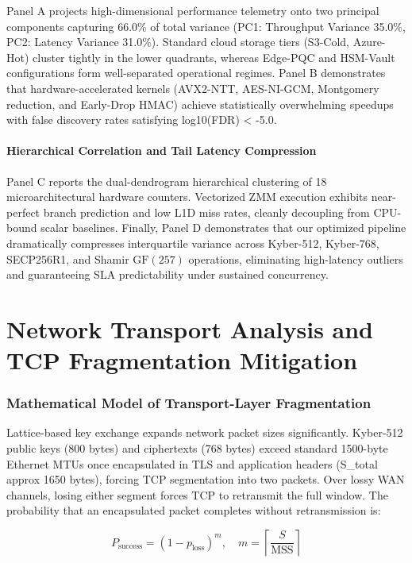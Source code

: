 \documentclass[5p,times]{elsarticle}
\begin{document}
Panel A projects high-dimensional performance telemetry onto two principal components capturing 66.0\% of total variance (PC1: Throughput Variance 35.0\%, PC2: Latency Variance 31.0\%). Standard cloud storage tiers (S3-Cold, Azure-Hot) cluster tightly in the lower quadrants, whereas Edge-PQC and HSM-Vault configurations form well-separated operational regimes. Panel B demonstrates that hardware-accelerated kernels (AVX2-NTT, AES-NI-GCM, Montgomery reduction, and Early-Drop HMAC) achieve statistically overwhelming speedups with false discovery rates satisfying log10(FDR) < -5.0.


\paragraph{Hierarchical Correlation and Tail Latency Compression}

Panel C reports the dual-dendrogram hierarchical clustering of 18 microarchitectural hardware counters. Vectorized ZMM execution exhibits near-perfect branch prediction and low L1D miss rates, cleanly decoupling from CPU-bound scalar baselines. Finally, Panel D demonstrates that our optimized pipeline dramatically compresses interquartile variance across Kyber-512, Kyber-768, SECP256R1, and Shamir $\text{GF}(257)$ operations, eliminating high-latency outliers and guaranteeing SLA predictability under sustained concurrency.


\section{Network Transport Analysis and TCP Fragmentation Mitigation}


\subsubsection{Mathematical Model of Transport-Layer Fragmentation}

Lattice-based key exchange expands network packet sizes significantly. Kyber-512 public keys (800 bytes) and ciphertexts (768 bytes) exceed standard 1500-byte Ethernet MTUs once encapsulated in TLS and application headers (S\_total approx 1650 bytes), forcing TCP segmentation into two packets. Over lossy WAN channels, losing either segment forces TCP to retransmit the full window. The probability that an encapsulated packet completes without retransmission is:

\begin{equation}
  P_{\text{success}} = (1 - p_{\text{loss}})^m, \quad m = \left\lceil \frac{S}{\text{MSS}} \right\rceil
\end{equation}
\end{document}
